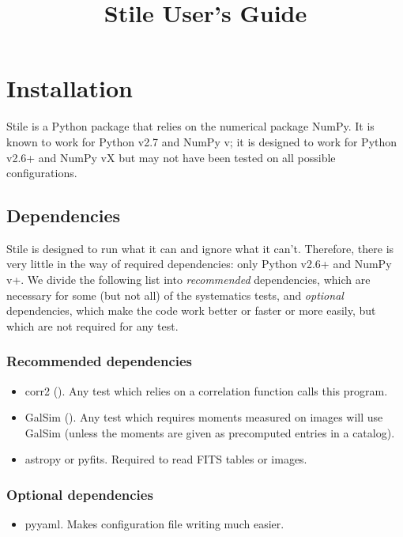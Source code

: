 \documentclass{article}
\title{Stile User's Guide}
\begin{document}
\maketitle

\section{Installation}

Stile is a Python package that relies on the numerical package NumPy.  It is known to work for
Python v2.7 and NumPy v; it is designed to work for Python v2.6+ and NumPy vX but may not have been
tested on all possible configurations.  

\subsection{Dependencies}
Stile is designed to run what it can and ignore what it can't.  Therefore, there is very little
in the way of required dependencies: only Python v2.6+ and NumPy v+. We divide the following list 
into {\em recommended} dependencies, which are necessary for some (but not all) of the systematics
tests, and {\em optional} dependencies, which make the code work better or faster or more easily, but
which are not required for any test.

\subsubsection{Recommended dependencies}

\begin{itemize}
\item corr2 ().  Any test which relies on a correlation function calls this program.
\item GalSim ().  Any test which requires moments measured on images will use GalSim (unless the 
moments are given as precomputed entries in a catalog).
\item astropy or pyfits.  Required to read FITS tables or images.
\end{itemize}

\subsubsection{Optional dependencies}
\begin{itemize}
\item pyyaml.  Makes configuration file writing much easier.
\end{itemize}
\end{document}
